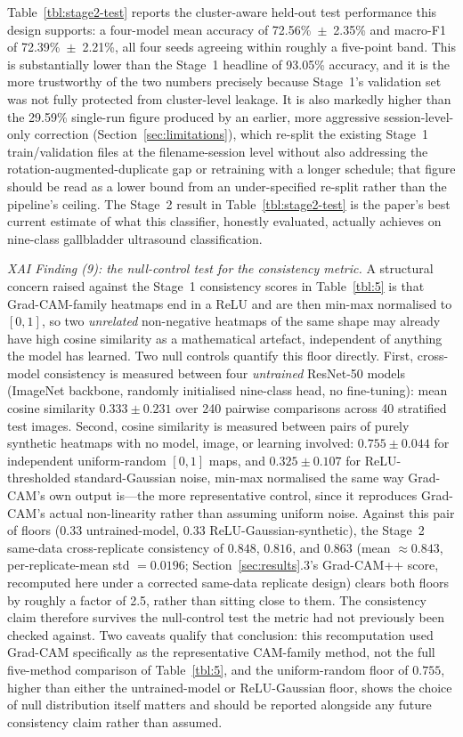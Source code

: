 Table~\ref{tbl:stage2-test} reports the cluster-aware held-out test performance this design supports: a four-model mean accuracy of 72.56\%~$\pm$~2.35\% and macro-F1 of 72.39\%~$\pm$~2.21\%, all four seeds agreeing within roughly a five-point band. This is substantially lower than the Stage~1 headline of 93.05\% accuracy, and it is the more trustworthy of the two numbers precisely because Stage~1's validation set was not fully protected from cluster-level leakage. It is also markedly higher than the 29.59\% single-run figure produced by an earlier, more aggressive session-level-only correction (Section~\ref{sec:limitations}), which re-split the existing Stage~1 train/validation files at the filename-session level without also addressing the rotation-augmented-duplicate gap or retraining with a longer schedule; that figure should be read as a lower bound from an under-specified re-split rather than the pipeline's ceiling. The Stage~2 result in Table~\ref{tbl:stage2-test} is the paper's best current estimate of what this classifier, honestly evaluated, actually achieves on nine-class gallbladder ultrasound classification.

\textit{XAI Finding (9): the null-control test for the consistency metric.} A structural concern raised against the Stage~1 consistency scores in Table~\ref{tbl:5} is that Grad-CAM-family heatmaps end in a ReLU and are then min-max normalised to $[0,1]$, so two \textit{unrelated} non-negative heatmaps of the same shape may already have high cosine similarity as a mathematical artefact, independent of anything the model has learned. Two null controls quantify this floor directly. First, cross-model consistency is measured between four \textit{untrained} ResNet-50 models (ImageNet backbone, randomly initialised nine-class head, no fine-tuning): mean cosine similarity $0.333\pm0.231$ over 240 pairwise comparisons across 40 stratified test images. Second, cosine similarity is measured between pairs of purely synthetic heatmaps with no model, image, or learning involved: $0.755\pm0.044$ for independent uniform-random $[0,1]$ maps, and $0.325\pm0.107$ for ReLU-thresholded standard-Gaussian noise, min-max normalised the same way Grad-CAM's own output is---the more representative control, since it reproduces Grad-CAM's actual non-linearity rather than assuming uniform noise. Against this pair of floors ($0.33$ untrained-model, $0.33$ ReLU-Gaussian-synthetic), the Stage~2 same-data cross-replicate consistency of $0.848$, $0.816$, and $0.863$ (mean $\approx0.843$, per-replicate-mean std $=0.0196$; Section~\ref{sec:results}.3's Grad-CAM++ score, recomputed here under a corrected same-data replicate design) clears both floors by roughly a factor of 2.5, rather than sitting close to them. The consistency claim therefore survives the null-control test the metric had not previously been checked against. Two caveats qualify that conclusion: this recomputation used Grad-CAM specifically as the representative CAM-family method, not the full five-method comparison of Table~\ref{tbl:5}, and the uniform-random floor of $0.755$, higher than either the untrained-model or ReLU-Gaussian floor, shows the choice of null distribution itself matters and should be reported alongside any future consistency claim rather than assumed.

